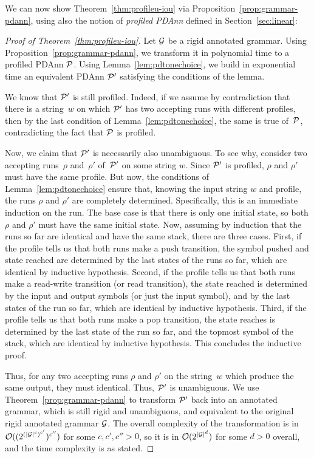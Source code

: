 %
%
%
%
%
%
%
%
%
%
%
%
%
%
%
We can now show Theorem~\ref{thm:profileu-iou} via
Proposition~\ref{prop:grammar-pdann}, using also the notion of \emph{profiled
PDAnn} defined in Section~\ref{sec:linear}:

\begin{proof}[Proof of Theorem~\ref{thm:profileu-iou}]
  Let $\mathcal{G}$ be a rigid annotated grammar. Using Proposition~\ref{prop:grammar-pdann}, we
  transform it in polynomial time to a profiled PDAnn $\mathcal{P}$.
  Using Lemma~\ref{lem:pdtonechoice}, we
  build in exponential time an equivalent PDAnn $\mathcal{P}'$ satisfying the conditions of the lemma.

  We know that $\mathcal{P}'$ is still profiled. Indeed, if we assume by
  contradiction that there is a string~$w$ on which $\mathcal{P}'$ has two accepting runs
  with different profiles, then by the last condition of
  Lemma~\ref{lem:pdtonechoice}, the same is true of~$\mathcal{P}$, contradicting the
  fact that $\mathcal{P}$ is profiled.

  Now, we claim that $\mathcal{P}'$ is necessarily also unambiguous. To see why,
  consider two accepting runs~$\rho$ and~$\rho'$ of~$\mathcal{P}'$ on some string $w$. Since
  $\mathcal{P}'$ is profiled, $\rho$ and $\rho'$ must have the same
  profile. But now, the conditions of Lemma~\ref{lem:pdtonechoice} ensure that,
  knowing the input string $w$ and profile, the runs $\rho$ and $\rho'$ are completely
  determined. Specifically, this is an immediate
  induction on the run. The base case is that there is only one initial state,
  so both $\rho$ and $\rho'$ must have the same initial state. Now, assuming by
  induction that the runs so far are identical and have the same stack, there
  are three cases. First, if the profile tells us that both runs make a push
  transition, the symbol pushed and state reached are determined by the last
  states of the runs so
  far, which are identical by inductive hypothesis. Second, if the profile tells us that both runs make
  a read-write transition (or read transition), the state reached is determined by the input and output
  symbols (or just the input symbol), and by the last states of the run so far, which are identical by
  inductive hypothesis. Third, if the profile tells
  us that both runs make a pop transition, the state reaches is determined by
  the last state of the run so far, and the topmost symbol of the stack, which
  are identical by inductive hypothesis. This concludes the inductive proof.

  Thus, for any two accepting runs $\rho$ and $\rho'$ on the string~$w$ which produce the same output, they must identical. Thus, $\mathcal{P}'$ is unambiguous.
  We use Theorem~\ref{prop:grammar-pdann} to transform $\mathcal{P}'$ back into an
  annotated grammar, which is still rigid and unambiguous, and equivalent to the
  original rigid annotated grammar $\mathcal{G}$. The overall complexity of the
  transformation is in $\mathcal{O}((2^{(|\mathcal{G}|^c)^{c'}})^{c''})$ for some $c, c', c'' > 0$,
  so it is in $\mathcal{O}(2^{|\mathcal{G}|^d})$ for some $d>0$ overall, and the time complexity
  is as stated.
\end{proof}



